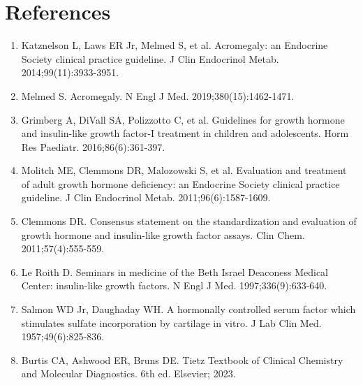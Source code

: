 \section*{References}
\begin{enumerate}
  \item Katznelson L, Laws ER Jr, Melmed S, et al. Acromegaly: an Endocrine Society clinical practice guideline. J Clin Endocrinol Metab. 2014;99(11):3933-3951.
  \item Melmed S. Acromegaly. N Engl J Med. 2019;380(15):1462-1471.
  \item Grimberg A, DiVall SA, Polizzotto C, et al. Guidelines for growth hormone and insulin-like growth factor-I treatment in children and adolescents. Horm Res Paediatr. 2016;86(6):361-397.
  \item Molitch ME, Clemmons DR, Malozowski S, et al. Evaluation and treatment of adult growth hormone deficiency: an Endocrine Society clinical practice guideline. J Clin Endocrinol Metab. 2011;96(6):1587-1609.
  \item Clemmons DR. Consensus statement on the standardization and evaluation of growth hormone and insulin-like growth factor assays. Clin Chem. 2011;57(4):555-559.
  \item Le Roith D. Seminars in medicine of the Beth Israel Deaconess Medical Center: insulin-like growth factors. N Engl J Med. 1997;336(9):633-640.
  \item Salmon WD Jr, Daughaday WH. A hormonally controlled serum factor which stimulates sulfate incorporation by cartilage in vitro. J Lab Clin Med. 1957;49(6):825-836.
  \item Burtis CA, Ashwood ER, Bruns DE. Tietz Textbook of Clinical Chemistry and Molecular Diagnostics. 6th ed. Elsevier; 2023.
\end{enumerate}

\clearpage
